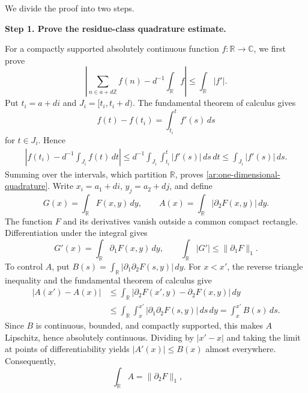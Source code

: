 \documentclass[twoside]{aomart}
\makeatletter
\theoremstyle{paperplain}
\theoremstyle{paperdefinition}
\renewenvironment{proof}[1][\proofname]{\par\pushQED{\qed}%
  \normalfont\topsep6\p@\@plus3\p@\relax\trivlist
  \item[\hskip\labelsep\itshape #1\@addpunct{.}]\ignorespaces
}{\popQED\endtrivlist\@endpefalse}
\newcommand{\Z}{\mathbb Z}
\newcommand{\R}{\mathbb R}
\newcommand{\C}{\mathbb C}
\numberwithin{equation}{section}
\makeatother
\begin{document}
\begin{proof}
We divide the proof into two steps.
\par
\medskip
\noindent\textbf{Step 1. Prove the residue-class quadrature estimate.}

For a compactly supported absolutely continuous function
$f:\R\to\C$, we first prove
\begin{equation}
 \left|\sum_{n\in a+d\Z}f(n)-d^{-1}\int_\R f\right|
 \le\int_\R|f'|.
 \label{ar:one-dimensional-quadrature}
\end{equation}
Put $t_i=a+di$ and $J_i=[t_i,t_i+d)$. The fundamental theorem
of calculus gives $$f(t)-f(t_i)=\int_{t_i}^t f'(s)\,ds$$ for
$t\in J_i$. Hence
\begin{equation}
 \begin{aligned}
 \left|f(t_i)-d^{-1}\int_{J_i}f(t)\,dt\right|
 \le d^{-1}\int_{J_i}\int_{t_i}^t|f'(s)|\,ds\,dt
 \le\int_{J_i}|f'(s)|\,ds.
 \end{aligned}
\end{equation}
Summing over the intervals, which partition $\R$, proves
\eqref{ar:one-dimensional-quadrature}.
Write $x_i=a_1+di$, $y_j=a_2+dj$, and define
\begin{equation}
 G(x)=\int_\R F(x,y)\,dy,\qquad
 A(x)=\int_\R|\partial_2F(x,y)|\,dy.
\end{equation}
The function $F$ and its derivatives vanish outside a common
compact rectangle. Differentiation under the integral gives
\begin{equation}
 G'(x)=\int_\R\partial_1F(x,y)\,dy,\qquad
 \int_\R|G'|\le\|\partial_1F\|_1.
\end{equation}
To control $A$, put
$B(s)=\int_\R|\partial_1\partial_2F(s,y)|\,dy$.
For $x<x'$, the reverse triangle inequality and the
fundamental theorem of calculus give
\begin{equation}
 \begin{aligned}
 |A(x')-A(x)|
 &\le\int_\R
       |\partial_2F(x',y)-\partial_2F(x,y)|\,dy\\
 &\le\int_\R\int_x^{x'}
       |\partial_1\partial_2F(s,y)|\,ds\,dy
   =\int_x^{x'}B(s)\,ds.
 \end{aligned}
\end{equation}
Since $B$ is continuous, bounded, and compactly supported,
this makes $A$ Lipschitz, hence absolutely continuous.
Dividing by $|x'-x|$ and taking the limit at points of
differentiability yields $|A'(x)|\le B(x)$ almost everywhere.
Consequently,
\begin{equation}
 \int_\R A=\|\partial_2F\|_1,\qquad

\end{equation}
\end{proof}
\end{document}
